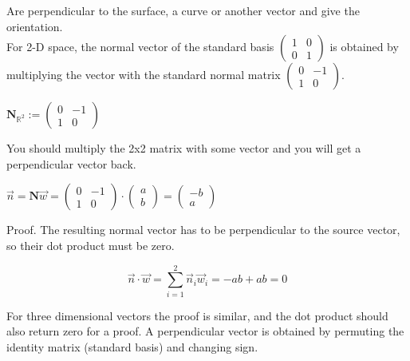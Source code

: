 \documentclass[a4paper]{article}
\begin{document}
Are perpendicular to the surface, a curve or another vector and give the orientation.\\

For 2-D space, the normal vector of the standard basis $\begin{pmatrix}1&0\\0&1\end{pmatrix}$ is obtained by multiplying the vector with the standard normal matrix $\begin{pmatrix}0 & -1 \\ 1 & 0\end{pmatrix}$.\\

\begin{center}
$\boldsymbol{N}_{\mathbb{R}^{2}} := \begin{pmatrix}0 & -1 \\ 1 & 0\end{pmatrix}$\\
\end{center}

You should multiply the 2x2 matrix with some vector and you will get a perpendicular vector back.

\begin{center}
$\vec{n} = \boldsymbol{N}\vec{w} = \begin{pmatrix}0 & -1 \\ 1 & 0\end{pmatrix} \cdot \begin{pmatrix}a\\b\end{pmatrix} = \begin{pmatrix}-b\\a\end{pmatrix}$
\end{center}

Proof. The resulting normal vector has to be perpendicular to the source vector, so their dot product must be zero.

\begin{displaymath}
\vec{n} \cdot \vec{w} = \sum_{i=1}^{2}\vec{n}_{i}\vec{w}_i = -ab + ab = 0
\end{displaymath}

For three dimensional vectors the proof is similar, and the dot product should also return zero for a proof. A perpendicular vector is obtained by permuting the identity matrix (standard basis) and changing sign.
\end{document}
